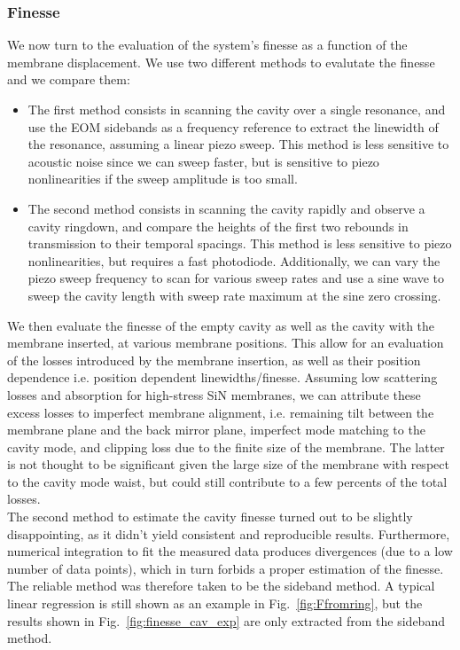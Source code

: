 \subsubsection{Finesse}
We now turn to the evaluation of the system's finesse as a function of the membrane displacement. We use two different methods to evalutate the finesse and we compare them: 
\begin{itemize}
  \item The first method consists in scanning the cavity over a single resonance, and use the EOM sidebands as a frequency reference to extract the linewidth of the resonance, assuming a linear piezo sweep. This method is less sensitive to acoustic noise since we can sweep faster, but is sensitive to piezo nonlinearities if the sweep amplitude is too small.
  \item The second method consists in scanning the cavity rapidly and observe a cavity ringdown, and compare the heights of the first two rebounds in transmission to their temporal spacings. This method is less sensitive to piezo nonlinearities, but requires a fast photodiode. Additionally, we can vary the piezo sweep frequency to scan for various sweep rates and use a sine wave to sweep the cavity length with sweep rate maximum at the sine zero crossing. 
\end{itemize}

We then evaluate the finesse of the empty cavity as well as the cavity with the membrane inserted, at various membrane positions. This allow for an evaluation of the losses introduced by the membrane insertion, as well as their position dependence i.e. position dependent linewidths/finesse. Assuming low scattering losses and absorption for high-stress SiN membranes, we can attribute these excess losses to imperfect membrane alignment, i.e. remaining tilt between the membrane plane and the back mirror plane, imperfect mode matching to the cavity mode, and clipping loss due to the finite size of the membrane. The latter is not thought to be significant given the large size of the membrane with respect to the cavity mode waist, but could still contribute to a few percents of the total losses. \\

The second method to estimate the cavity finesse turned out to be slightly disappointing, as it didn't yield consistent and reproducible results. Furthermore, numerical integration to fit the measured data produces divergences (due to a low number of data points), which in turn forbids a proper estimation of the finesse. The reliable method was therefore taken to be the sideband method. A typical linear regression is still shown as an example in Fig.~\ref{fig:Ffromring}, but the results shown in Fig.~\ref{fig:finesse_cav_exp} are only extracted from the sideband method. \\ 

